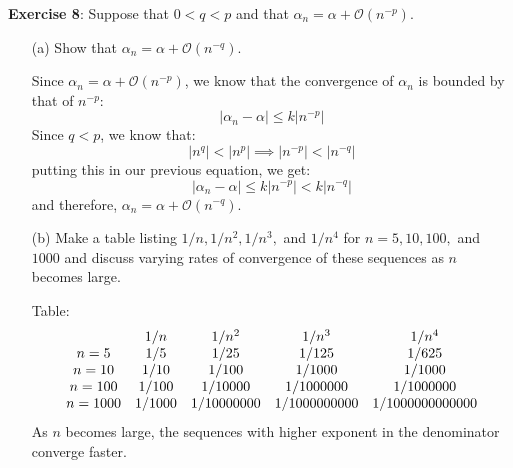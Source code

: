 \documentclass{article}
\begin{document}
\textbf{Exercise 8}:
    Suppose that $0 < q < p$ and that $\alpha_{n} = \alpha + \mathcal{O}(n^{-p})$.
        \begin{itemize}
            \item [(a)] Show that $\alpha_{n} = \alpha + \mathcal{O}(n^{-q})$.
                \begin{answer}
                    Since $\alpha_{n} = \alpha + \mathcal{O}(n^{-p})$, we know that the convergence of $\alpha_{n}$ is bounded by that of $n^{-p}$:
                        \begin{equation*}
                            \lvert \alpha_{n} - \alpha \rvert \leq k\lvert n^{-p} \rvert
                        \end{equation*}
                    Since $q < p$, we know that:
                        \begin{equation*}
                            \lvert n^{q} \rvert < \lvert n^{p} \rvert \implies \lvert n^{-p} \rvert < \lvert n^{-q} \rvert
                        \end{equation*}
                    putting this in our previous equation, we get:
                        \begin{equation*}
                            \lvert \alpha_{n} - \alpha \rvert \leq k \lvert n^{-p} \rvert < k \lvert n^{-q} \rvert
                        \end{equation*}
                    and therefore, $\alpha_{n} = \alpha + \mathcal{O}(n^{-q})$.
                \end{answer}

            \item [(b)] Make a table listing $1/n, 1/n^{2}, 1/n^{3}, $ and $1/n^{4}$ for $n = 5, 10, 100, $ and $1000$ and discuss varying rates of convergence of these sequences as $n$ becomes large. 
                \begin{answer}
                    Table:
                        \begin{align*}
                            \begin{array}{ c c c c c }
                                         & 1/n    & 1/n^{2}    & 1/n^{3}      & 1/n^{4}         \\
                                n = 5    & 1/5    & 1/25       & 1/125        & 1/625           \\
                                n = 10   & 1/10   & 1/100      & 1/1000       & 1/1000          \\
                                n = 100  & 1/100  & 1/10000    & 1/1000000    & 1/1000000       \\
                                n = 1000 & 1/1000 & 1/10000000 & 1/1000000000 & 1/1000000000000   
                            \end{array}
                        \end{align*}
                    As $n$ becomes large, the sequences with higher exponent in the denominator converge faster.
                \end{answer}
        \end{itemize}
\end{document}
